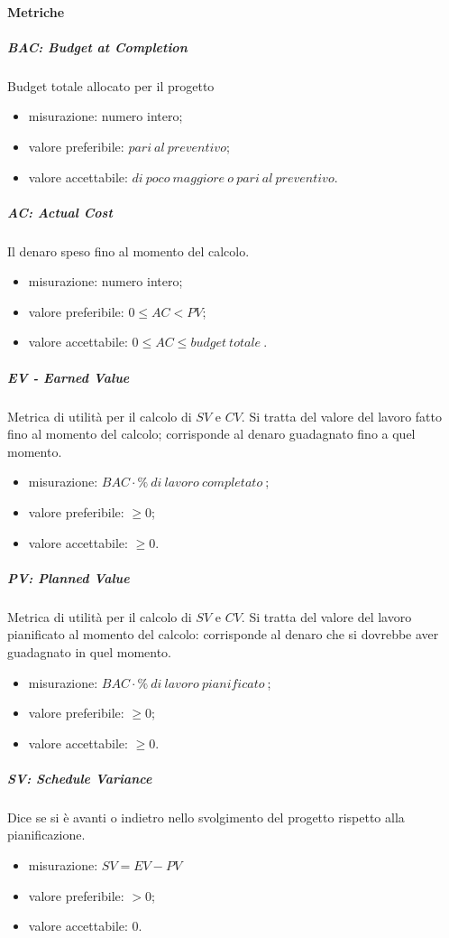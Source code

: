 		\paragraph{Metriche}
		\subparagraph{BAC: Budget at Completion}
		Budget totale allocato per il progetto
		\begin{itemize}
			\item misurazione: numero intero;
			\item valore preferibile: $pari\ al\ preventivo$;
			\item valore accettabile: $di\ poco\ maggiore\ o\ pari\ al\ preventivo$.
		\end{itemize}
			\subparagraph{AC: Actual Cost}
			Il denaro speso fino al momento del calcolo.
			\begin{itemize}
				\item  misurazione: numero intero;
				\item  valore preferibile: $0 \leq AC < PV$;
				\item  valore accettabile: $0 \leq AC \leq budget\ totale\ $.
			\end{itemize}
			\subparagraph{EV - Earned Value}
			Metrica di utilità per il calcolo di $SV$ e $CV$. Si tratta del valore del lavoro fatto fino al momento del calcolo; corrisponde al denaro guadagnato fino a quel momento.
			\begin{itemize}
				\item  misurazione: $BAC \cdot \%\ di\ lavoro\ completato\ $;
				\item  valore preferibile: $ \geq 0$;
				\item  valore accettabile: $ \geq 0$.
			\end{itemize}
			\subparagraph{PV: Planned Value}
			Metrica di utilità per il calcolo di $SV$ e $CV$. Si tratta del valore del lavoro pianificato al momento del calcolo: corrisponde al denaro che si dovrebbe aver guadagnato in quel momento.
			\begin{itemize}
				\item  misurazione: $BAC \cdot \%\ di\ lavoro\ pianificato\ $;
				\item  valore preferibile: $ \geq 0$;
				\item  valore accettabile: $ \geq 0$.
			\end{itemize}			
			\subparagraph{SV: Schedule Variance}
			Dice se si è avanti o indietro nello svolgimento del progetto rispetto alla pianificazione.
			\begin{itemize}
				\item misurazione: $SV = EV - PV$
				\item valore preferibile: $ > 0$;
				\item valore accettabile: 0.
			\end{itemize}
